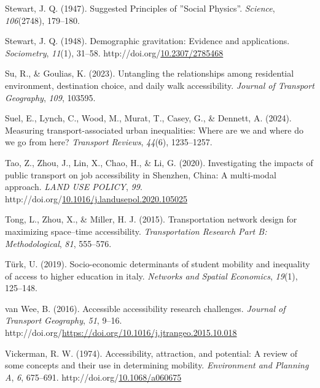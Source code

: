 \documentclass[
11pt, %
oneside, %
english, %
singlespacing, %
]{macthesis} %
\newlength{\cslhangindent}
\newenvironment{CSLReferences}[2] %
{\begin{list}{}{%
	\setlength{\itemindent}{0pt}
	\setlength{\leftmargin}{0pt}
	\setlength{\parsep}{0pt}
	\ifodd #1
	\setlength{\leftmargin}{\cslhangindent}
	\setlength{\itemindent}{-1\cslhangindent}
	\fi
	\setlength{\itemsep}{#2\baselineskip}}}
{\end{list}}
\begin{document}
\begin{CSLReferences}{1}{0}
Stewart, J. Q. (1947). Suggested {Principles} of ''{Social} {Physics}''. \emph{Science}, \emph{106}(2748), 179--180.

Stewart, J. Q. (1948). Demographic gravitation: Evidence and applications. \emph{Sociometry}, \emph{11}(1), 31--58. http://doi.org/\href{https://doi.org/10.2307/2785468}{10.2307/2785468}

Su, R., \& Goulias, K. (2023). Untangling the relationships among residential environment, destination choice, and daily walk accessibility. \emph{Journal of Transport Geography}, \emph{109}, 103595.

Suel, E., Lynch, C., Wood, M., Murat, T., Casey, G., \& Dennett, A. (2024). Measuring transport-associated urban inequalities: Where are we and where do we go from here? \emph{Transport Reviews}, \emph{44}(6), 1235--1257.

Tao, Z., Zhou, J., Lin, X., Chao, H., \& Li, G. (2020). Investigating the impacts of public transport on job accessibility in {Shenzhen}, {China}: A multi-modal approach. \emph{LAND USE POLICY}, \emph{99}. http://doi.org/\href{https://doi.org/10.1016/j.landusepol.2020.105025}{10.1016/j.landusepol.2020.105025}

Tong, L., Zhou, X., \& Miller, H. J. (2015). Transportation network design for maximizing space--time accessibility. \emph{Transportation Research Part B: Methodological}, \emph{81}, 555--576.

Türk, U. (2019). Socio-economic determinants of student mobility and inequality of access to higher education in italy. \emph{Networks and Spatial Economics}, \emph{19}(1), 125--148.

van Wee, B. (2016). Accessible accessibility research challenges. \emph{Journal of Transport Geography}, \emph{51}, 9--16. http://doi.org/\url{https://doi.org/10.1016/j.jtrangeo.2015.10.018}

Vickerman, R. W. (1974). Accessibility, attraction, and potential: A review of some concepts and their use in determining mobility. \emph{Environment and Planning A}, \emph{6}, 675--691. http://doi.org/\href{https://doi.org/10.1068/a060675}{10.1068/a060675}


\end{CSLReferences}
\end{document}
